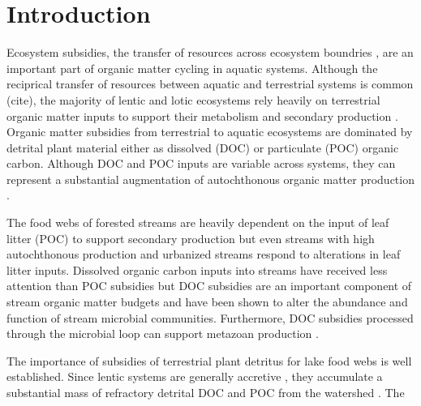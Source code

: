 \section{Introduction}
Ecosystem subsidies, the transfer of resources across ecosystem boundries \cite{Polis_1997}, are an important part of organic matter cycling in aquatic systems. Although the reciprical transfer of resources between aquatic and terrestrial systems is common (cite), the majority of lentic and lotic ecosystems rely heavily on terrestrial organic matter inputs to support their metabolism and secondary production \cite{Marcarelli_2011}. Organic matter subsidies from terrestrial to aquatic ecosystems are dominated by detrital plant material either as dissolved (DOC) or particulate (POC) organic carbon. Although DOC and POC inputs are variable across systems, they can represent a substantial augmentation of autochthonous organic matter production \cite{Hodkinson_1975,GASITH_1976,wetzel_1984,WETZEL_1995,Webster_1997,Kobayashi_2011,Mehring_2014}.   

The food webs of forested streams are heavily dependent on the input of leaf litter (POC) to support secondary production \cite{wallaceetal_1999}  but even streams with high autochthonous production \cite{Mineau_2012} and urbanized streams \cite{Duan_2014} respond to alterations in leaf litter inputs. Dissolved organic carbon inputs into streams have received less attention than POC subsidies but DOC subsidies are an important component of stream organic matter budgets \cite{McDowell_1976} and have been shown to alter the abundance \cite{Bott_1984} and function \cite{Bernhardt_2002} of stream microbial communities. Furthermore, DOC subsidies processed through the microbial loop can support metazoan production \cite{Hall_1998,Wilcox_2005}.

The importance of subsidies of terrestrial plant detritus for lake food webs is well established. Since lentic systems are generally accretive \cite{WETZEL_2001}, they accumulate a substantial mass of refractory detrital DOC and POC from the watershed \cite{Rich_1978,wetzel_1984,WETZEL_1995}. The 




